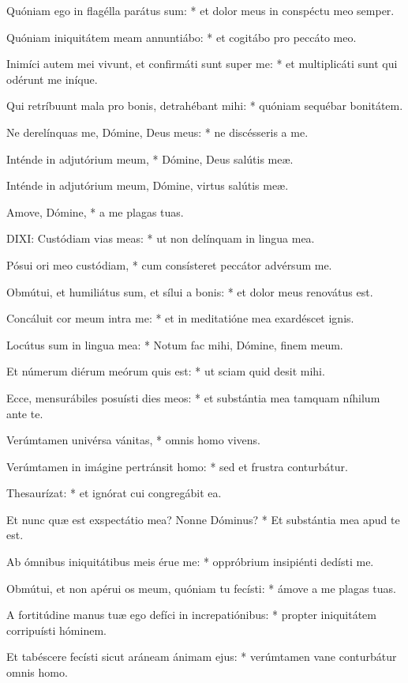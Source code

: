Quóniam ego in flagélla parátus sum: * et dolor meus in conspéctu meo semper.

Quóniam iniquitátem meam annuntiábo: * et cogitábo pro peccáto meo.

Inimíci autem mei vivunt, et confirmáti sunt super me: * et multiplicáti sunt qui odérunt me iníque.

Qui retríbuunt mala pro bonis, detrahébant mihi: * quóniam sequébar bonitátem.

Ne derelínquas me, Dómine, Deus meus: * ne discésseris a me.

Inténde in adjutórium meum, * Dómine, Deus salútis meæ.

 Inténde in adjutórium meum, Dómine, virtus salútis meæ.

 Amove, Dómine, * a me plagas tuas.


\lettrine[lines=2]{D}{IXI}: Custódiam vias meas: * ut non delínquam in lingua mea.

Pósui ori meo custódiam, * cum consísteret peccátor advérsum me.

Obmútui, et humiliátus sum, et sílui a bonis: * et dolor meus renovátus est.

Concáluit cor meum intra me: * et in meditatióne mea exardéscet ignis.

Locútus sum in lingua mea: * Notum fac mihi, Dómine, finem meum.

Et númerum diérum meórum quis est: * ut sciam quid desit mihi.

Ecce, mensurábiles posuísti dies meos: * et substántia mea tamquam níhilum ante te.

Verúmtamen univérsa vánitas, * omnis homo vivens.

Verúmtamen in imágine pertránsit homo: * sed et frustra conturbátur.

Thesaurízat: * et ignórat cui congregábit ea.

Et nunc quæ est exspectátio mea? Nonne Dóminus? * Et substántia mea apud te est.

Ab ómnibus iniquitátibus meis érue me: * oppróbrium insipiénti dedísti me.

Obmútui, et non apérui os meum, quóniam tu fecísti: * ámove a me plagas tuas.

A fortitúdine manus tuæ ego defíci in increpatiónibus: * propter iniquitátem corripuísti hóminem.

Et tabéscere fecísti sicut aráneam ánimam ejus: * verúmtamen vane conturbátur omnis homo.


